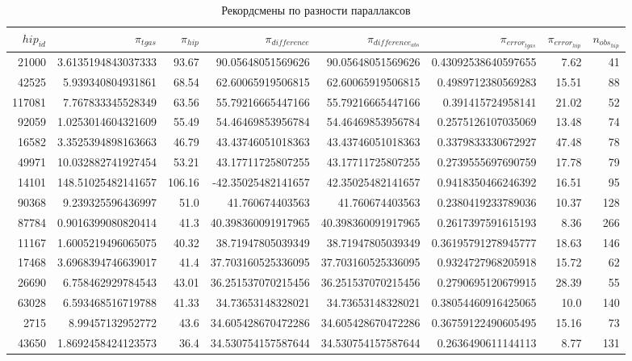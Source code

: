 \documentclass[14pt]{article} %
\begin{document}
\newpage
\begin{landscape}
\begin{spacing}{1.0}
\begin{table}[h]
\caption{Рекордсмены по разности параллаксов}
\label{tabular:75_25}
\begin{tabular}{|r|r|r|r|r|r|r|r|}
\hline 	
$hip_{id}$ &$\pi_{tgas}$ &$\pi_{hip}$ &$\pi_{difference}$ &$\pi_{difference_{abs}}$ &$\pi_{error_{tgas}}$ &$\pi_{error_{hip}}$ &$n_{obs_{hip}}$\\
\hline 
21000&3.6135194843037333&93.67&90.05648051569626&90.05648051569626&0.43092538640597655&7.62&41\\
42525&5.939340804931861&68.54&62.60065919506815&62.60065919506815&0.4989712380569283&15.51&88\\
117081&7.767833345528349&63.56&55.79216665447166&55.79216665447166&0.391415724958141&21.02&52\\
92059&1.0253014604321609&55.49&54.46469853956784&54.46469853956784&0.2575126107035069&13.48&74\\
16582&3.3525394898163663&46.79&43.43746051018363&43.43746051018363&0.3379833330672927&47.48&78\\
49971&10.032882741927454&53.21&43.17711725807255&43.17711725807255&0.2739555697690759&17.78&79\\
14101&148.51025482141657&106.16&-42.35025482141657&42.35025482141657&0.9418350466246392&16.51&95\\
90368&9.239325596436997&51.0&41.760674403563&41.760674403563&0.2380419233789036&10.37&128\\
87784&0.9016399080820414&41.3&40.398360091917965&40.398360091917965&0.2617397591615193&8.36&266\\
11167&1.6005219496065075&40.32&38.71947805039349&38.71947805039349&0.36195791278945777&18.63&146\\
17468&3.6968394746639017&41.4&37.703160525336095&37.703160525336095&0.9324727968205918&15.72&62\\
26690&6.758462929784543&43.01&36.251537070215456&36.251537070215456&0.2790695120679915&28.39&55\\
63028&6.593468516719788&41.33&34.73653148328021&34.73653148328021&0.38054460916425065&10.0&140\\
2715&8.99457132952772&43.6&34.605428670472286&34.605428670472286&0.36759122490605495&15.16&73\\
43650&1.8692458424123573&36.4&34.530754157587644&34.530754157587644&0.2636490611144113&8.77&131\\

\end{tabular}
\end{table}
\end{spacing}
\end{landscape}
\end{document}
